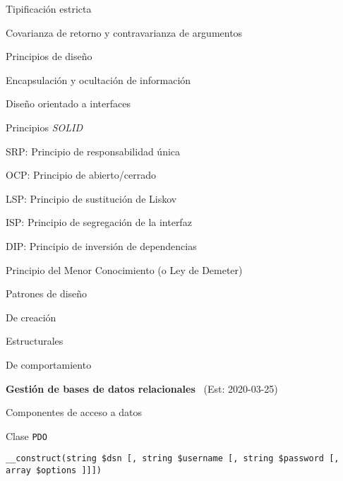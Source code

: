 \begin{longenum}
\begin{longenum}
\begin{longenum}
            \item Tipificación estricta
            \item Covarianza de retorno y contravarianza de argumentos
        \end{longenum}
        \item Principios de diseño
        \begin{longenum}
            \item Encapsulación y ocultación de información
            \item Diseño orientado a interfaces
            \item Principios \textit{SOLID}
            \begin{longenum}
                \item SRP: Principio de responsabilidad única
                \item OCP: Principio de abierto/cerrado
                \item LSP: Principio de sustitución de Liskov
                \item ISP: Principio de segregación de la interfaz
                \item DIP: Principio de inversión de dependencias
            \end{longenum}
            \item Principio del Menor Conocimiento (o Ley de Demeter)
        \end{longenum}
        \item Patrones de diseño
        \begin{longenum}
            \item De creación
            \item Estructurales
            \item De comportamiento
        \end{longenum}
    \end{longenum}
    \item \textbf{Gestión de bases de datos relacionales} \ (Est: 2020-03-25)
    \begin{longenum}
        \item Componentes de acceso a datos
        \begin{longenum}
            \item Clase \texttt{PDO}
            \begin{longenum}
                \item \texttt{\_\_construct(string \$dsn [, string \$username [, string \$password [, array \$options ]]])}

\end{longenum}
\end{longenum}
\end{longenum}
\end{longenum}
